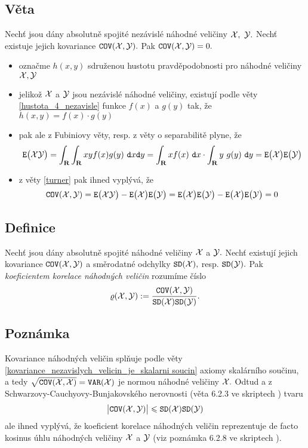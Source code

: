 \subsection{V\v eta}\label{kovariance_nezavislych_velicin}

Nech\v t jsou d\'any absolutn\v e spojit\'e nez\'avisl\'e n\'ahodn\'e veli\v ciny ${\mathcal X}, ~{\mathcal Y}.$ Nech\v t existuje jejich kovariance $\mathtt{COV}({\mathcal X},{\mathcal Y}).$ Pak $\mathtt{COV}({\mathcal X},{\mathcal Y})=0.$\\

\Proof

\begin{itemize}
\item ozna\v cme $h(x,y)$ sdru\v zenou hustotu pravd\v epodobnosti pro n\'ahodn\'e veli\v ciny ${\mathcal X},{\mathcal Y}$
\item jeliko\v z ${\mathcal X}$ a ${\mathcal Y}$  jsou nez\'avisl\'e n\'ahodn\'e veli\v ciny, existuj\'i podle v\v ety \ref{hustota_4_nezavisle} funkce $f(x)$ a $g(y)$ tak, \v ze $h(x,y)=f(x)\cdot g(y)$
\item pak ale z Fubiniovy v\v ety, resp. z v\v ety o separabilit\v e plyne, \v ze  $$\mathtt{E}\bigl({\mathcal X}{\mathcal Y}\bigr)= \int_{\mathbf R}\int_{\mathbf R} xyf(x) g(y)~\mathtt{d}x\mathtt{d}y =\int_{\mathbf R} xf(x)~\mathtt{d}x \cdot \int_{\mathbf R} y~g(y)~\mathtt{d}y= \mathtt{E}\bigl({\mathcal X}\bigr)\mathtt{E}\bigl({\mathcal Y}\bigr)$$
\item z v\v ety \ref{turner} pak ihned vypl\'yv\'a, \v ze $$\mathtt{COV}({\mathcal X},{\mathcal Y}) = \mathtt{E}\bigl({\mathcal X}{\mathcal Y}\bigr)-\mathtt{E}\bigl({\mathcal X}\bigr)\mathtt{E}\bigl({\mathcal Y}\bigr) = \mathtt{E}\bigl({\mathcal X}\bigr)\mathtt{E}\bigl({\mathcal Y}\bigr) - \mathtt{E}\bigl({\mathcal X}\bigr)\mathtt{E}\bigl({\mathcal Y}\bigr)=0$$
\end{itemize}

\subsection{Definice}

Nech\v t jsou d\'any absolutn\v e spojit\'e n\'ahodn\'e veli\v ciny ${\mathcal X}$ a ${\mathcal Y}.$ Nech\v t existuj\'i jejich kovariance $\mathtt{COV}({\mathcal X},{\mathcal Y})$ a sm\v erodatn\'e odchylky $\mathtt{SD}({\mathcal X}),$ resp. $\mathtt{SD}({\mathcal Y}).$ Pak \emph{koeficientem korelace n\'ahodn\'ych veli\v cin} rozum\'ime \v c\'islo
%
$$\varrho({\mathcal X},{\mathcal Y}):= \frac{\mathtt{COV}({\mathcal X},{\mathcal Y})}{\mathtt{SD}({\mathcal X})\mathtt{SD}({\mathcal Y})}.$$

\subsection{Pozn\'amka}\label{paul_carrack}

Kovariance n\'ahodn\'ych veli\v cin spl\v nuje podle v\v ety \ref{kovariance_nezavislych_velicin_je_skalarni soucin} axiomy skal\'arn\'iho sou\v cinu, a tedy $\sqrt{\mathtt{COV}({\mathcal X},{\mathcal X})}=\mathtt{VAR}({\mathcal X})$ je normou n\'ahodn\'e veli\v ciny ${\mathcal X}.$ Odtud a z Schwarzovy-Cauchyovy-Bunjakovského nerovnosti (v\v eta 6.2.3 ve skriptech \cite{Krbalek_MAB3}) tvaru
%
$$\bigl|\mathtt{COV}({\mathcal X},{\mathcal Y})\bigr| \leqslant \mathtt{SD}({\mathcal X})\mathtt{SD}({\mathcal Y})$$
%
ale ihned vypl\'yv\'a, \v ze koeficient korelace n\'ahodn\'ych veli\v cin reprezentuje de facto kosinus \'uhlu n\'ahodn\'ych veli\v ciny ${\mathcal X}$ a ${\mathcal Y}$ (viz pozn\'amka 6.2.8 ve skriptech \cite{Krbalek_MAB3}).

